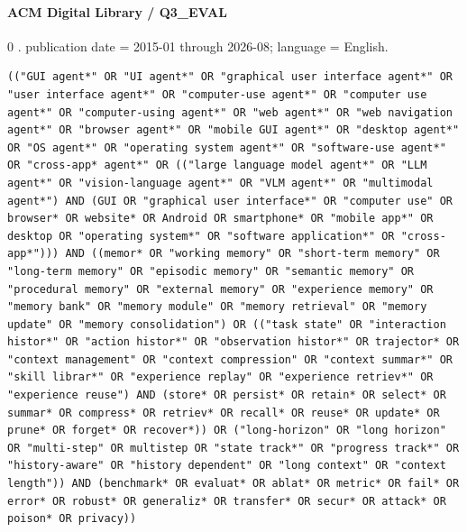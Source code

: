\noindent\begin{minipage}{\linewidth}
\paragraph{ACM Digital Library / Q3\_EVAL}
0 .
publication date = 2015-01 through 2026-08; language = English.
\begin{lstlisting}
(("GUI agent*" OR "UI agent*" OR "graphical user interface agent*" OR "user interface agent*" OR "computer-use agent*" OR "computer use agent*" OR "computer-using agent*" OR "web agent*" OR "web navigation agent*" OR "browser agent*" OR "mobile GUI agent*" OR "desktop agent*" OR "OS agent*" OR "operating system agent*" OR "software-use agent*" OR "cross-app* agent*" OR (("large language model agent*" OR "LLM agent*" OR "vision-language agent*" OR "VLM agent*" OR "multimodal agent*") AND (GUI OR "graphical user interface*" OR "computer use" OR browser* OR website* OR Android OR smartphone* OR "mobile app*" OR desktop OR "operating system*" OR "software application*" OR "cross-app*"))) AND ((memor* OR "working memory" OR "short-term memory" OR "long-term memory" OR "episodic memory" OR "semantic memory" OR "procedural memory" OR "external memory" OR "experience memory" OR "memory bank" OR "memory module" OR "memory retrieval" OR "memory update" OR "memory consolidation") OR (("task state" OR "interaction histor*" OR "action histor*" OR "observation histor*" OR trajector* OR "context management" OR "context compression" OR "context summar*" OR "skill librar*" OR "experience replay" OR "experience retriev*" OR "experience reuse") AND (store* OR persist* OR retain* OR select* OR summar* OR compress* OR retriev* OR recall* OR reuse* OR update* OR prune* OR forget* OR recover*)) OR ("long-horizon" OR "long horizon" OR "multi-step" OR multistep OR "state track*" OR "progress track*" OR "history-aware" OR "history dependent" OR "long context" OR "context length")) AND (benchmark* OR evaluat* OR ablat* OR metric* OR fail* OR error* OR robust* OR generaliz* OR transfer* OR secur* OR attack* OR poison* OR privacy))
\end{lstlisting}
\end{minipage}\par\medskip

